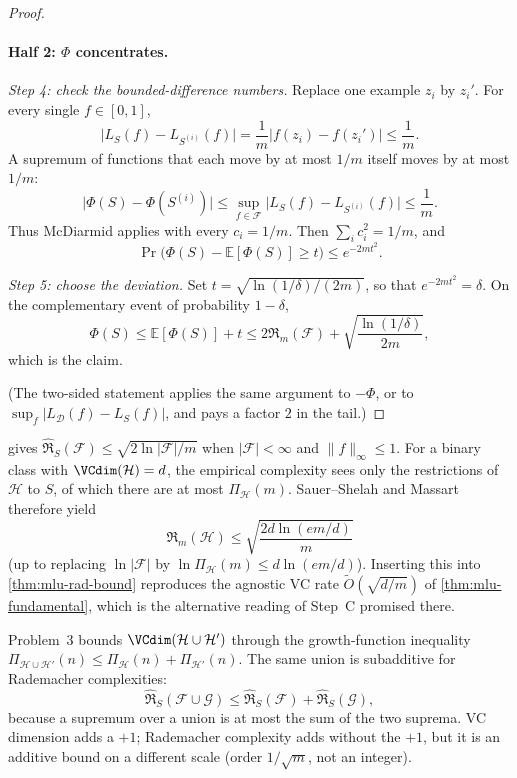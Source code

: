 \begin{proof}
\paragraph{Half 2: $\Phi$ concentrates.}

\textit{Step 4: check the bounded-difference numbers.}
Replace one example $z_i$ by $z_i'$. For every single $f\in[0,1]$,
\[
\bigl\lvert L_S(f)-L_{S^{(i)}}(f)\bigr\rvert
=
\frac1m\bigl\lvert f(z_i)-f(z_i')\bigr\rvert
\le
\frac1m.
\]
A supremum of functions that each move by at most $1/m$ itself moves by at most $1/m$:
\[
\bigl\lvert\Phi(S)-\Phi(S^{(i)})\bigr\rvert
\le
\sup_{f\in\mathcal{F}}\bigl\lvert L_S(f)-L_{S^{(i)}}(f)\bigr\rvert
\le
\frac1m.
\]
Thus McDiarmid applies with every $c_i=1/m$. Then $\sum_i c_i^2=1/m$, and
\[
\Pr\bigl(\Phi(S)-\mathbb{E}[\Phi(S)]\ge t\bigr)
\le
e^{-2mt^2}.
\]

\textit{Step 5: choose the deviation.}
Set $t=\sqrt{\ln(1/\delta)/(2m)}$, so that $e^{-2mt^2}=\delta$. On the complementary event of probability $1-\delta$,
\[
\Phi(S)
\le
\mathbb{E}[\Phi(S)]+t
\le
2\mathfrak{R}_m(\mathcal{F})+\sqrt{\frac{\ln(1/\delta)}{2m}},
\]
which is the claim.

(The two-sided statement applies the same argument to $-\Phi$, or to $\sup_f\lvert L_{\mathcal{D}}(f)-L_S(f)\rvert$, and pays a factor $2$ in the tail.)
\end{proof}

\begin{property}
\label{prop:mlu-rad-bounds}
 gives $\widehat{\mathfrak{R}}_S(\mathcal{F})\le\sqrt{2\ln\lvert\mathcal{F}\rvert/m}$ when $\lvert\mathcal{F}\rvert<\infty$ and $\lVert f\rVert_\infty\le 1$. For a binary class with $\VCdim(\mathcal{H})=d$, the empirical complexity sees only the restrictions of $\mathcal{H}$ to $S$, of which there are at most $\Pi_{\mathcal{H}}(m)$. Sauer--Shelah and Massart therefore yield
\[
\mathfrak{R}_m(\mathcal{H})
\le
\sqrt{\frac{2d\ln(em/d)}{m}}
\]
(up to replacing $\ln\lvert\mathcal{F}\rvert$ by $\ln\Pi_{\mathcal{H}}(m)\le d\ln(em/d)$). Inserting this into \cref{thm:mlu-rad-bound} reproduces the agnostic VC rate $\widetilde{O}(\sqrt{d/m})$ of \cref{thm:mlu-fundamental}, which is the alternative reading of Step~C promised there.
\end{property}

\begin{remark}
\label{rem:mlu-rad-vs-vc}
Problem~3 bounds $\VCdim(\mathcal{H}\cup\mathcal{H}')$ through the growth-function inequality $\Pi_{\mathcal{H}\cup\mathcal{H}'}(n)\le\Pi_{\mathcal{H}}(n)+\Pi_{\mathcal{H}'}(n)$. The same union is subadditive for Rademacher complexities:
\[
\widehat{\mathfrak{R}}_S(\mathcal{F}\cup\mathcal{G})
\le
\widehat{\mathfrak{R}}_S(\mathcal{F})+\widehat{\mathfrak{R}}_S(\mathcal{G}),
\]
because a supremum over a union is at most the sum of the two suprema. VC dimension adds a $+1$; Rademacher complexity adds without the $+1$, but it is an additive bound on a different scale (order $1/\sqrt{m}$, not an integer).
\end{remark}

